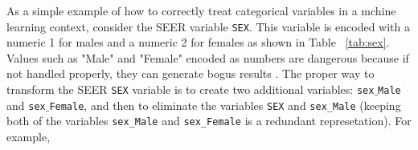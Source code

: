 \documentclass[a4paper,11pt]{article}
\newcommand{\codewhite}[1]{\colorbox{white}{\texttt{#1}}}
\begin{document}
As a simple example of how to correctly treat categorical variables in a mchine learning context, consider the SEER variable \codewhite{SEX}. This variable is encoded with a numeric 1 for males and a numeric 2 for females as shown in Table ~\ref{tab:sex}. Values such as "Male" and "Female" encoded as numbers are dangerous because if not handled properly, they can generate bogus results \cite{downey}. The proper way to transform the SEER \codewhite{SEX} variable is to create two additional variables: \codewhite{sex$\_$Male} and \codewhite{sex$\_$Female}, and then to eliminate the variables \codewhite{SEX} and \codewhite{sex\_Male} (keeping both of the variables \codewhite{sex\_Male} and \codewhite{sex\_Female} is a redundant represetation). For example,





\end{document}
